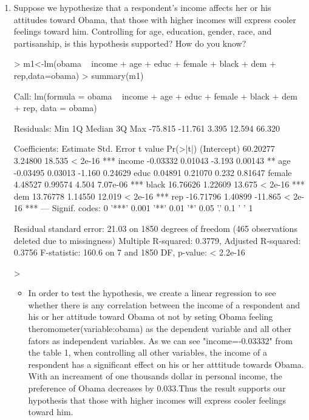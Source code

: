 \documentclass[12pt]{article}
\begin{document}
\begin{enumerate}
\item Suppose we hypothesize that a respondent's income affects her or his attitudes toward Obama, that those with higher incomes will express cooler feelings toward him.  Controlling for age, education, gender, race, and partisanship, is this hypothesis supported?  How do you know?

\begin{Schunk}
\begin{Sinput}
> m1<-lm(obama ~ income + age + educ + female + black + dem + rep,data=obama)
> summary(m1)
\end{Sinput}
\begin{Soutput}
Call:
lm(formula = obama ~ income + age + educ + female + black + dem + 
    rep, data = obama)

Residuals:
    Min      1Q  Median      3Q     Max 
-75.815 -11.761   3.395  12.594  66.320 

Coefficients:
             Estimate Std. Error t value Pr(>|t|)    
(Intercept)  60.20277    3.24800  18.535  < 2e-16 ***
income       -0.03332    0.01043  -3.193  0.00143 ** 
age          -0.03495    0.03013  -1.160  0.24629    
educ          0.04891    0.21070   0.232  0.81647    
female        4.48527    0.99574   4.504 7.07e-06 ***
black        16.76626    1.22609  13.675  < 2e-16 ***
dem          13.76778    1.14550  12.019  < 2e-16 ***
rep         -16.71796    1.40899 -11.865  < 2e-16 ***
---
Signif. codes:  0 '***' 0.001 '**' 0.01 '*' 0.05 '.' 0.1 ' ' 1

Residual standard error: 21.03 on 1850 degrees of freedom
  (465 observations deleted due to missingness)
Multiple R-squared:  0.3779,	Adjusted R-squared:  0.3756 
F-statistic: 160.6 on 7 and 1850 DF,  p-value: < 2.2e-16
\end{Soutput}
\begin{Sinput}
> 
\end{Sinput}
\end{Schunk}
\begin{itemize}
  \item In order to test the hypothesis, we create a linear regression to see whether there is any correlation between the income of a respondent and his or her attitude toward Obama ot not by seting Obama feeling theromometer(variable:obama) as the dependent variable and all other fators as independent variables. 
As we can see "income=-0.03332" from the table 1, when controlling all other variables, the income of a respondent has a significant effect on his or her atttitude towards Obama. With an increament of one thousands dollar in personal income, the preference of Obama decreases by 0.033.Thus the result supports our hypothesis that those with higher incomes will express cooler feelings toward him.
\end{itemize}




\end{enumerate}
\end{document}
